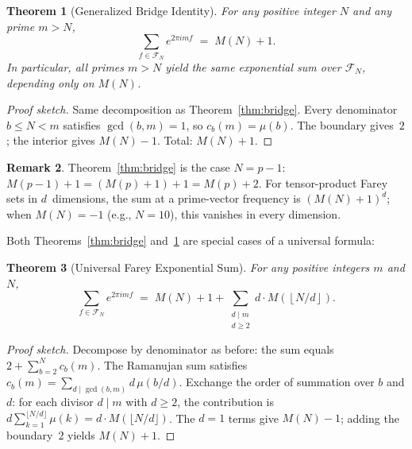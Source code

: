 \documentclass[11pt]{article}
\newtheorem{theorem}{Theorem}[section]
\theoremstyle{definition}
\newtheorem{remark}[theorem]{Remark}
\newcommand{\F}{\mathcal{F}}
\begin{document}
\begin{theorem}[Generalized Bridge Identity]\label{thm:gen-bridge}
For any positive integer $N$ and any prime $m > N$,
\begin{equation}\label{eq:gen-bridge}
  \sum_{f \in \F_N} e^{2\pi i m f} \;=\; M(N) + 1.
\end{equation}
In particular, all primes $m > N$ yield the \emph{same}
exponential sum over $\F_N$, depending only on $M(N)$.
\end{theorem}

\begin{proof}[Proof sketch]
Same decomposition as Theorem~\ref{thm:bridge}.  Every
denominator $b \le N < m$ satisfies $\gcd(b, m) = 1$,
so $c_b(m) = \mu(b)$.  The boundary gives~$2$; the
interior gives $M(N) - 1$.  Total: $M(N) + 1$.
\end{proof}

\begin{remark}
Theorem~\ref{thm:bridge} is the case $N = p - 1$:
$M(p-1) + 1 = (M(p) + 1) + 1 = M(p) + 2$.
For tensor-product Farey sets in $d$~dimensions, the sum
at a prime-vector frequency is $(M(N)+1)^d$; when $M(N) = -1$
(e.g., $N = 10$), this vanishes in every dimension.
\end{remark}

Both Theorems~\ref{thm:bridge} and~\ref{thm:gen-bridge} are
special cases of a universal formula:

\begin{theorem}[Universal Farey Exponential Sum]\label{thm:universal}
For any positive integers $m$ and $N$,
\begin{equation}\label{eq:universal}
  \sum_{f \in \F_N} e^{2\pi i m f}
  \;=\; M(N) + 1
  + \sum_{\substack{d \mid m \\ d \ge 2}} d \cdot M\!\left(\left\lfloor N/d \right\rfloor\right).
\end{equation}
\end{theorem}

\begin{proof}[Proof sketch]
Decompose by denominator as before: the sum equals $2 + \sum_{b=2}^{N}
c_b(m)$.  The Ramanujan sum satisfies $c_b(m) = \sum_{d \mid \gcd(b,m)}
d\,\mu(b/d)$.  Exchange the order of summation over $b$ and $d$:
for each divisor $d \mid m$ with $d \ge 2$, the contribution is
$d \sum_{k=1}^{\lfloor N/d \rfloor} \mu(k) = d \cdot M(\lfloor N/d \rfloor)$.
The $d = 1$ terms give $M(N) - 1$; adding the boundary~$2$ yields
$M(N) + 1$.
\end{proof}
\end{document}
